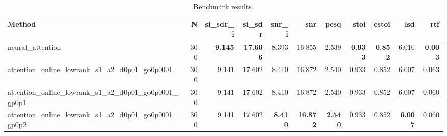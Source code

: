 \begin{table}[t]
\centering
\caption{Benchmark results.}
\label{tab:bench}
\begin{tabular}{lrrrrrrrrrr}
\toprule
Method & N & si\_sdr\_i & si\_sdr & snr\_i & snr & pesq & stoi & estoi & lsd & rtf \\
\midrule
neural_attention & 300 & \textbf{9.145} & \textbf{17.606} & 8.393 & 16.855 & 2.539 & \textbf{0.933} & \textbf{0.852} & 6.010 & \textbf{0.003} \\
attention_online_lowrank_s1_a2_d0p01_go0p0001 & 300 & 9.141 & 17.602 & 8.410 & 16.872 & 2.540 & 0.933 & 0.852 & 6.007 & 0.063 \\
attention_online_lowrank_s1_a2_d0p01_go0p0001_gp0p1 & 300 & 9.141 & 17.602 & 8.410 & 16.872 & 2.540 & 0.933 & 0.852 & 6.007 & 0.060 \\
attention_online_lowrank_s1_a2_d0p01_go0p0001_gp0p2 & 300 & 9.141 & 17.602 & \textbf{8.410} & \textbf{16.872} & \textbf{2.540} & 0.933 & 0.852 & \textbf{6.007} & 0.060 \\
\bottomrule
\end{tabular}
\end{table}